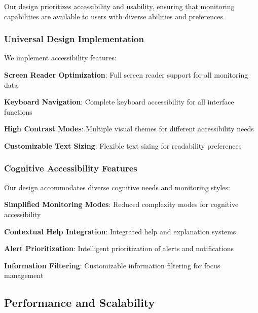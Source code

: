 Our design prioritizes accessibility and usability, ensuring that monitoring capabilities are available to users with diverse abilities and preferences.

\subsubsection*{Universal Design Implementation}

We implement accessibility features:

\begin{expandedlist}
    \item \textbf{Screen Reader Optimization}: Full screen reader support for all monitoring data
    \item \textbf{Keyboard Navigation}: Complete keyboard accessibility for all interface functions
    \item \textbf{High Contrast Modes}: Multiple visual themes for different accessibility needs
    \item \textbf{Customizable Text Sizing}: Flexible text sizing for readability preferences
\end{expandedlist}

\subsubsection*{Cognitive Accessibility Features}

Our design accommodates diverse cognitive needs and monitoring styles:

\begin{compactlist}
    \item \textbf{Simplified Monitoring Modes}: Reduced complexity modes for cognitive accessibility
    \item \textbf{Contextual Help Integration}: Integrated help and explanation systems
    \item \textbf{Alert Prioritization}: Intelligent prioritization of alerts and notifications
    \item \textbf{Information Filtering}: Customizable information filtering for focus management
\end{compactlist}

\subsection*{Performance and Scalability}

